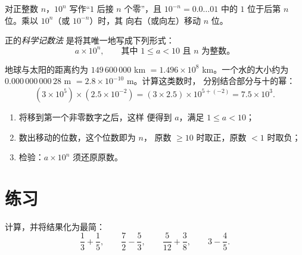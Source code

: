 \begin{proposition}[十的幂]\label{prop:g9:fractions:ten}
对正整数 $n$，$10^n$ 写作“$1$ 后接 $n$
个零”，且 $10^{-n} = 0.0\dots01$ 中的 $1$ 位于后第 $n$
位。乘以 $10^n$（或 $10^{-n}$）时，其
向右（或向左）移动 $n$ 位。
\end{proposition}

\begin{definition}[科学记数法]\label{def:g9:fractions:scientific}
正的\emph{科学记数法}
是将其唯一地写成下列形式：
\[
a \times 10^n,
\qquad\text{其中 } 1 \leq a < 10 \text{ 且 } n \text{ 为整数。}
\]
\end{definition}

\begin{example}\label{ex:g9:fractions:scientific}
地球与太阳的距离约为 $149\,600\,000$ km $= 1.496 \times
10^8$ km。一个水的大小约为 $0.000\,000\,000\,28$ m
$= 2.8 \times 10^{-10}$ m。计算这类数时，
分别结合部分与十的幂：
\[
(3 \times 10^5) \times (2.5 \times 10^{-2})
= (3 \times 2.5) \times 10^{5 + (-2)}
= 7.5 \times 10^{3}.
\]
\end{example}

\begin{method}[将数写成科学记数法]\label{met:g9:fractions:scientific}
\begin{enumerate}
  \item 将移到第一个非零数字之后，这样
        便得到 $a$，满足 $1 \leq a < 10$；
  \item 数出移动的位数，这个位数即为 $n$，
        原数 $\geq 10$ 时取正，原数
        $< 1$ 时取负；
  \item 检验：$a \times 10^n$ 须还原原数。
\end{enumerate}
\end{method}

\section{练习}

\begin{exercise}[$\star$]\label{exo:g9:fractions:1}
计算，并将结果化为最简：
\[
\frac13 + \frac15, \qquad
\frac72 - \frac53, \qquad
\frac{5}{12} + \frac38, \qquad
3 - \frac45 .
\]
\end{exercise}

